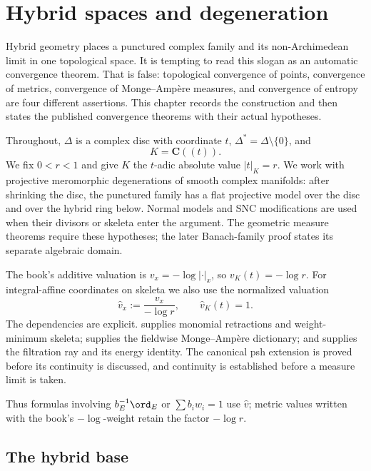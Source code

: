 \chapter{Hybrid spaces and degeneration}
\label{chap:hybrid-spaces}

Hybrid geometry places a punctured complex family and its
non-Archimedean limit in one topological space. It is tempting to read
this slogan as an automatic convergence theorem. That is false:
topological convergence of points, convergence of metrics, convergence
of Monge--Amp\`ere measures, and convergence of entropy are four
different assertions. This chapter records the construction and then
states the published convergence theorems with their actual hypotheses.

Throughout, $\Delta$ is a complex disc with coordinate $t$,
$\Delta^*=\Delta\setminus\{0\}$, and
\[
                         K=\mathbf C((t)).
\tag{66.1}\label{eq:hybrid-base-field}
\]
We fix $0<r<1$ and give $K$ the $t$-adic absolute value
$|t|_K=r$. We work with projective meromorphic degenerations of smooth complex
manifolds: after shrinking the disc, the punctured family has a flat
projective model over the disc and over the hybrid ring below. Normal
models and SNC modifications are used when their divisors or skeleta enter
the argument. The geometric measure theorems require these hypotheses;
the later Banach-family proof states its separate algebraic domain.

The book's additive valuation is $v_x=-\log|\cdot|_x$, so
$v_K(t)=-\log r$.  For integral-affine coordinates on skeleta we also
use the normalized valuation
\[
                    \widehat v_x:=\frac{v_x}{-\log r},
                    \qquad \widehat v_K(t)=1.
\]
The dependencies are explicit.  supplies monomial
retractions and weight-minimum skeleta;  supplies the
fieldwise Monge--Amp\`ere dictionary; and
 supplies the filtration ray and its energy
identity. The canonical psh extension is proved before its continuity is
discussed, and continuity is established before a measure limit is taken.

Thus formulas involving $b_E^{-1}\ord_E$ or
$\sum b_iw_i=1$ use $\widehat v$; metric values written with the
book's $-\log$-weight retain the factor $-\log r$.

\section{The hybrid base}
\label{sec:hybrid-base}

